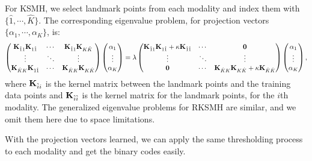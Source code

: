 For \mbox{KSMH}, we select landmark points from each modality and index them with $ \{\hat{1},\cdots,\hat{K}\} $. The corresponding eigenvalue problem, for projection vectors $ \{\alpha_1,\cdots,\alpha_K\} $, is:
\begin{align}\footnotesize
\begin{pmatrix}
\K_{\hat{1}1}\K_{1\hat{1}} & \cdots &\K_{\hat{1}1}\K_{K\hat{K}} \\
\vdots & \ddots &\vdots \\
\K_{\hat{K}K}\K_{1\hat{1}}&\cdots &\K_{\hat{K}K}\K_{K\hat{K}} \end{pmatrix}\begin{pmatrix}\alpha_1\\\vdots\\\alpha_K\end{pmatrix} =
\lambda  \begin{pmatrix}
\K_{\hat{1}1}\K_{1\hat{1}}+\kappa\K_{\hat{1}\hat{1}} & \cdots &\0 \\
\vdots & \ddots &\vdots \\
\0&\cdots &\K_{\hat{K}K}\K_{K\hat{K}}+\kappa\K_{\hat{K}\hat{K}} \end{pmatrix}\begin{pmatrix}
\alpha_{1}\\
\vdots \\
\alpha_{K}\end{pmatrix},\nonumber
\end{align} 
where $ {\bf K}_{\hat{i}i} $ is the kernel matrix between the landmark points and the training data points and $ {\bf K}_{\hat{i}\hat{i}} $ is the kernel matrix for the landmark points, for the $ i $th modality. The generalized eigenvalue problems for \mbox{RKSMH} are similar, and we omit them here due to space limitations.

With the projection vectors learned, we can apply the same thresholding process to each modality and get the binary codes easily.



